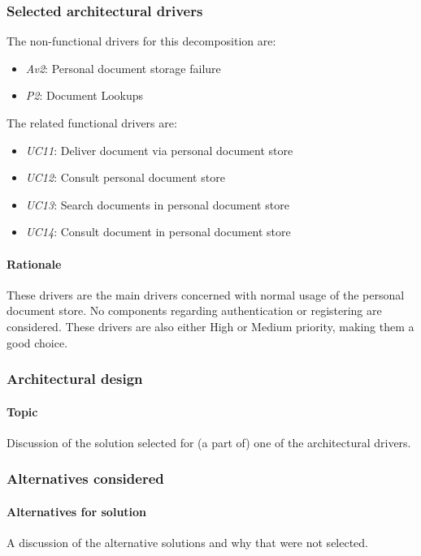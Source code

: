 \documentclass[a4paper,10pt]{article}
\begin{document}
\subsubsection{Selected architectural drivers}
The non-functional drivers for this decomposition are:

\begin{itemize}
    \item \emph{Av2}: Personal document storage failure
    \item \emph{P2}: Document Lookups
\end{itemize}

The related functional drivers are:

\begin{itemize}
    \item \emph{UC11}: Deliver document via personal document store
    \item \emph{UC12}: Consult personal document store
    \item \emph{UC13}: Search documents in personal document store
    \item \emph{UC14}: Consult document in personal document store
\end{itemize}

\paragraph{Rationale}
These drivers are the main drivers concerned with normal usage of the personal document store. No components regarding authentication or registering are considered. These drivers are also either High or Medium priority, making them a good choice.

\subsubsection{Architectural design}
\paragraph{Topic}
Discussion of the solution selected for (a part of) one of the architectural
drivers.

\subsubsection*{Alternatives considered}
\paragraph{Alternatives for solution}
A discussion of the alternative solutions and why that were not selected.
\end{document}
